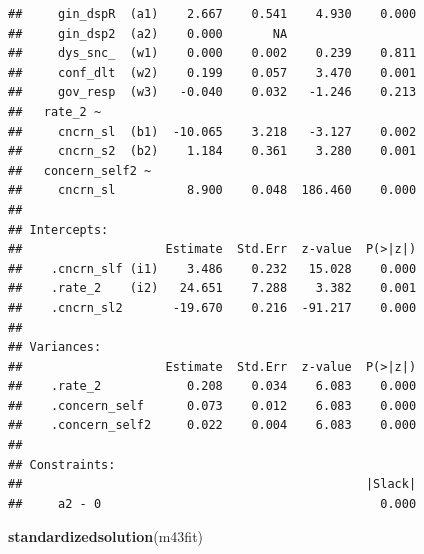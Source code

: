 \documentclass[
]{article}
\newenvironment{Shaded}{\begin{snugshade}}{\end{snugshade}}
\newcommand{\KeywordTok}[1]{\textcolor[rgb]{0.13,0.29,0.53}{\textbf{#1}}}
\newcommand{\NormalTok}[1]{#1}
\begin{document}
\begin{verbatim}
##     gin_dspR  (a1)    2.667    0.541    4.930    0.000
##     gin_dsp2  (a2)    0.000       NA                  
##     dys_snc_  (w1)    0.000    0.002    0.239    0.811
##     conf_dlt  (w2)    0.199    0.057    3.470    0.001
##     gov_resp  (w3)   -0.040    0.032   -1.246    0.213
##   rate_2 ~                                            
##     cncrn_sl  (b1)  -10.065    3.218   -3.127    0.002
##     cncrn_s2  (b2)    1.184    0.361    3.280    0.001
##   concern_self2 ~                                     
##     cncrn_sl          8.900    0.048  186.460    0.000
## 
## Intercepts:
##                    Estimate  Std.Err  z-value  P(>|z|)
##    .cncrn_slf (i1)    3.486    0.232   15.028    0.000
##    .rate_2    (i2)   24.651    7.288    3.382    0.001
##    .cncrn_sl2       -19.670    0.216  -91.217    0.000
## 
## Variances:
##                    Estimate  Std.Err  z-value  P(>|z|)
##    .rate_2            0.208    0.034    6.083    0.000
##    .concern_self      0.073    0.012    6.083    0.000
##    .concern_self2     0.022    0.004    6.083    0.000
## 
## Constraints:
##                                                |Slack|
##     a2 - 0                                       0.000
\end{verbatim}

\begin{Shaded}
\begin{Highlighting}[]
\KeywordTok{standardizedsolution}\NormalTok{(m43fit)}
\end{Highlighting}
\end{Shaded}
\end{document}
